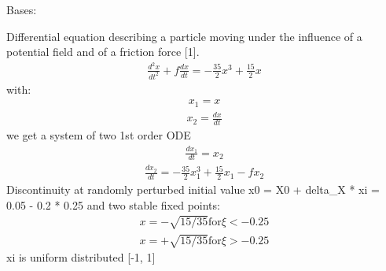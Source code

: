 \documentclass[letterpaper,10pt,english,openany,oneside]{sphinxmanual}
\begin{document}
\begin{fulllineitems}
\label{\detokenize{pygpc.testfunctions:pygpc.testfunctions.testfunctions.MovingParticleFrictionForce}}
Bases: {\hyperref[\detokenize{pygpc:pygpc.AbstractModel.AbstractModel}]{}}

Differential equation describing a particle moving under the influence of a
potential field and of a friction force {[}1{]}.
\begin{equation*}
\begin{split}\frac{d^2 x}{dt^2} + f \frac{dx}{dt} = -\frac{35}{2} x^3 + \frac{15}{2} x\end{split}
\end{equation*}
with:
\begin{equation*}
\begin{split}x_1 = x\end{split}
\end{equation*}\begin{equation*}
\begin{split}x_2 = \frac{dx}{dt}\end{split}
\end{equation*}
we get a system of two 1st order ODE
\begin{equation*}
\begin{split}\frac{d x_1}{dt} = x_2\end{split}
\end{equation*}\begin{equation*}
\begin{split}\frac{d x_2}{dt} = -\frac{35}{2} x_1^3 + \frac{15}{2} x_1 - f x_2\end{split}
\end{equation*}
Discontinuity at randomly perturbed initial value x0 = X0 + delta\_X * xi = 0.05 - 0.2 * 0.25
and two stable fixed points:
\begin{equation*}
\begin{split}x = -\sqrt{15/35} \mathrm{for} \xi < -0.25\end{split}
\end{equation*}\begin{equation*}
\begin{split}x = +\sqrt{15/35} \mathrm{for} \xi > -0.25\end{split}
\end{equation*}
xi is uniform distributed {[}-1, 1{]}


\end{fulllineitems}
\end{document}
